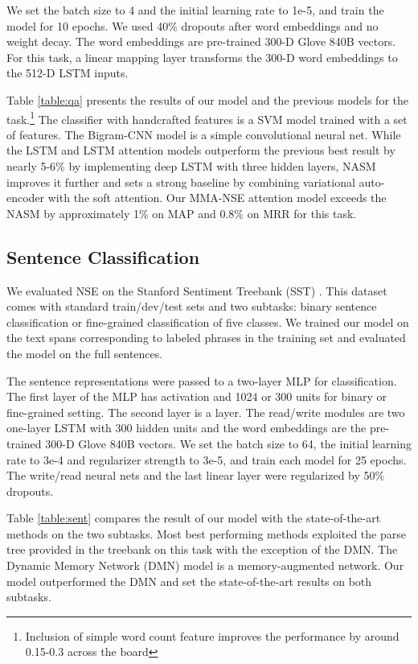 \documentclass{article}
\begin{document}
We set the batch size to 4 and the initial learning rate to 1e-5, and train the model for 10 epochs. We used 40\% dropouts after word embeddings and no  weight decay. The word embeddings are pre-trained 300-D Glove 840B vectors. For this task, a linear mapping layer transforms the 300-D word embeddings to the 512-D LSTM inputs.

Table \ref{table:qa} presents the results of our model and the previous models for the task.\footnote{Inclusion of simple word count feature improves the performance by around 0.15-0.3 across the board} The classifier with handcrafted features is a SVM model trained with a set of features. The Bigram-CNN model is a simple convolutional neural net. While the LSTM and LSTM attention models outperform the previous best result by nearly 5-6\% by implementing deep LSTM with three hidden layers, NASM improves it further and sets a strong baseline by combining variational auto-encoder \cite{kingma2014auto} with the soft attention. Our MMA-NSE attention model exceeds the NASM by approximately 1\% on MAP and 0.8\% on MRR for this task.

\subsection{Sentence Classification}

We evaluated NSE on the Stanford Sentiment Treebank (SST) \cite{socher2013recursive}. This dataset comes with standard train/dev/test sets and two subtasks: binary sentence classification or fine-grained classification of five classes. We trained our model on the text spans corresponding to labeled phrases in the training set and evaluated the model on the full sentences. 

The sentence representations were passed to a two-layer MLP for classification. The first layer of the MLP has  activation and 1024 or 300 units for binary or fine-grained setting. The second layer is a  layer. The read/write modules are two one-layer LSTM with 300 hidden units and the word embeddings are the pre-trained 300-D Glove 840B vectors. We set the batch size to 64, the initial learning rate to 3e-4 and  regularizer strength to 3e-5, and train each model for 25 epochs. The write/read neural nets and the last linear layer were regularized by 50\% dropouts. 

Table \ref{table:sent} compares the result of our model with the state-of-the-art methods on the two subtasks. Most best performing methods exploited the parse tree provided in the treebank on this task with the exception of the DMN. The Dynamic Memory Network (DMN) model is a memory-augmented network. Our model outperformed the DMN and set the state-of-the-art results on both subtasks.
\end{document}
